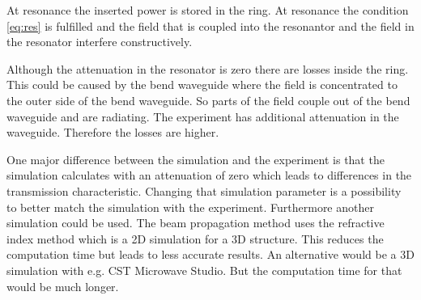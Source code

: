 % 
At resonance the inserted power is stored in the ring. At resonance the condition \eqref{eq:res} is fulfilled and the field that is coupled into the resonantor and the field in the resonator interfere constructively. 

Although the attenuation in the resonator is zero there are losses inside the ring. This could be caused by the bend waveguide where the field is concentrated to the outer side of the bend waveguide. So parts of the field couple out of the bend waveguide and are radiating.
The experiment has additional attenuation in the waveguide. Therefore the losses are higher.


One major difference between the simulation and the experiment is that the simulation calculates with an attenuation of zero which leads to differences in the transmission characteristic. Changing that simulation parameter is a possibility to better match the simulation with the experiment. 
Furthermore another simulation could be used. The beam propagation method uses the refractive index method which is a 2D simulation for a 3D structure. This reduces the computation time but leads to less accurate results. An alternative would be a 3D simulation with e.g. CST Microwave Studio. But the computation time for that would be much longer. 
